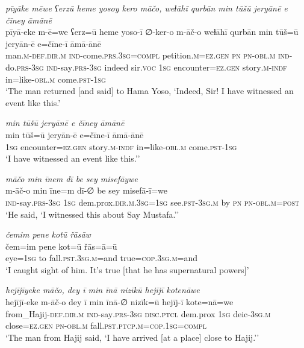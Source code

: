 \ea \label{ŽP.57}
\textit{pīyāke mēwe ʕerzū heme yosoy kero māčo, weɫāhī qurbān min tūšū jeryānē e čīney āmānē} \\ 
\gll pīyā-eke m-ē=we ʕerz=ū heme yoso-ī ∅-ker-o m-āč-o weɫāhī qurbān min tūš=ū jeryān-ē e=čīne-ī āmā-ānē \\ 
 man\textsc{.m}\textsc{-def}\textsc{.dir}\textsc{.m} \textsc{ind-}come\textsc{.prs}\textsc{.3sg}\textsc{=compl} petition\textsc{.m}\textsc{\textsc{=ez.gen}} \textsc{pn} \textsc{pn}\textsc{-obl}\textsc{.m} \textsc{ind-}do\textsc{.prs}\textsc{-3sg} \textsc{ind-}say\textsc{.prs}\textsc{-3sg} indeed sir.\textsc{voc} \textsc{1sg} encounter\textsc{\textsc{=ez.gen}} story\textsc{.m}\textsc{-indf} in=like\textsc{-obl}\textsc{.m} come\textsc{.pst}\textsc{-\textsc{1sg}} \\ 
\glt `The man returned [and said] to Hama Yoso, ‘Indeed, Sir! I have witnessed an event like this.'
\z 
 
\ea \label{ŽP.58}
\textit{min tūšū jeryānē e čīney āmānē} \\ 
\gll min tūš=ū jeryān-ē e=čīne-ī āmā-ānē \\ 
 \textsc{1sg} encounter\textsc{\textsc{=ez.gen}} story\textsc{.m}\textsc{-indf} in=like\textsc{-obl}\textsc{.m} come\textsc{.pst}\textsc{-\textsc{1sg}} \\ 
\glt `I have witnessed an event like this.’'
\z 
 
\ea \label{ŽP.74}
\textit{māčo min īnem dī be sey misefāywe} \\ 
\gll m-āč-o min īne=m dī-∅ be sey misefā-ī=we \\ 
 \textsc{ind-}say\textsc{.prs}\textsc{-3sg} \textsc{1sg} dem.prox\textsc{.dir}\textsc{.m}\textsc{.3sg}\textsc{=\textsc{1sg}} see\textsc{.pst}\textsc{-3sg}\textsc{.m} by \textsc{pn} \textsc{pn}\textsc{-obl}\textsc{.m}\textsc{=\textsc{post}} \\ 
\glt `He said, ‘I witnessed this about Say Mustafa.’'
\z 
 
\ea \label{ŽP.76}
\textit{čemim pene kotū řāsāw} \\ 
\gll čem=im pene kot=ū řās=ā=ū \\ 
 eye\textsc{=\textsc{1sg}} to fall\textsc{.pst}\textsc{.3sg}\textsc{.m}=and true\textsc{=cop}\textsc{.3sg}\textsc{.m}=and \\ 
\glt `I caught sight of him. It’s true [that he has supernatural powers]'
\z 
 
\ea \label{ŽP.102}
\textit{hejījīyeke māčo, dey ī min īnā nizīkū hejījī kotenāwe} \\ 
\gll hejījī-eke m-āč-o dey ī min īnā-∅ nizīk=ū hejīj-ī kote=nā=we \\ 
 from\_Hajij\textsc{-def}\textsc{.dir}\textsc{.m} \textsc{ind-}say\textsc{.prs}\textsc{-3sg} \textsc{disc.ptcl} dem.prox \textsc{1sg} deic\textsc{-3sg}\textsc{.m} close\textsc{\textsc{=ez.gen}} \textsc{pn}\textsc{-obl}\textsc{.m} fall\textsc{.pst}\textsc{.ptcp}\textsc{.m}\textsc{=cop}\textsc{.\textsc{1sg}}\textsc{=compl} \\ 
\glt `The man from Hajij said, ‘I have arrived [at a place] close to Hajij.’'
\z 
 
